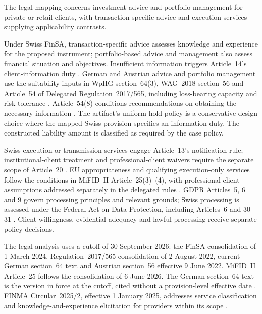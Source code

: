 \documentclass[oneside,10pt,english]{swissi}
\begin{document}
The legal mapping concerns investment advice and portfolio management for private or retail clients, with transaction-specific advice and execution services supplying applicability contrasts.

Under Swiss FinSA, transaction-specific advice assesses knowledge and experience for the proposed instrument; portfolio-based advice and management also assess financial situation and objectives. Insufficient information triggers Article~14's client-information duty \parencite[arts.~11--14]{switzerland2018finsa}. German and Austrian advice and portfolio management use the suitability inputs in WpHG section~64(3), WAG~2018 section~56 and Article~54 of Delegated Regulation~2017/565, including loss-bearing capacity and risk tolerance \parencite{germany1994wphg64,austria2018wag,europeancommission2017suitability}. Article~54(8) conditions recommendations on obtaining the necessary information \parencite[art.~54(8)]{europeancommission2017suitability}. The artifact's uniform hold policy is a conservative design choice where the mapped Swiss provision specifies an information duty. The constructed liability amount is classified as required by the case policy.

Swiss execution or transmission services engage Article~13's notification rule; institutional-client treatment and professional-client waivers require the separate scope of Article~20 \parencite[arts.~13 and 20]{switzerland2018finsa}. EU appropriateness and qualifying execution-only services follow the conditions in MiFID~II Article~25(3)--(4), with professional-client assumptions addressed separately in the delegated rules \parencites[art.~25]{europeanunion2014mifidii}[arts.~54--56]{europeancommission2017suitability}. GDPR Articles~5, 6 and 9 govern processing principles and relevant grounds; Swiss processing is assessed under the Federal Act on Data Protection, including Articles~6 and 30--31 \parencite{europeanunion2016gdpr,switzerland2020fadp}. Client willingness, evidential adequacy and lawful processing receive separate policy decisions.

The legal analysis uses a cutoff of 30 September 2026: the FinSA consolidation of 1 March 2024, Regulation~2017/565 consolidation of 2 August 2022, current German section~64 text and Austrian section~56 effective 9 June 2022. MiFID~II Article~25 follows the consolidation of 6 June 2026. The German section~64 text is the version in force at the cutoff, cited without a provision-level effective date \parencite{switzerland2018finsa,europeancommission2017suitability,germany1994wphg64,austria2018wag,europeanunion2014mifidii}. FINMA Circular~2025/2, effective 1 January 2025, addresses service classification and knowledge-and-experience elicitation for providers within its scope \parencite[paras.~2, 4 and 13--14]{finma2025conduct}.
\end{document}
